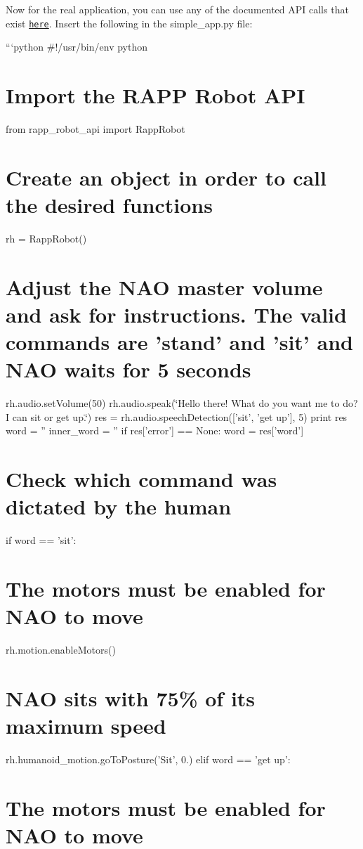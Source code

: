 Now for the real application, you can use any of the documented A\-P\-I calls that exist \href{https://github.com/rapp-project/rapp-robots-api/tree/master/python}{\tt here}. Insert the following in the {\ttfamily simple\-\_\-app.\-py} file\-:

```python \#!/usr/bin/env python

\section*{Import the R\-A\-P\-P Robot A\-P\-I}

from rapp\-\_\-robot\-\_\-api import Rapp\-Robot \section*{Create an object in order to call the desired functions}

rh = Rapp\-Robot()

\section*{Adjust the N\-A\-O master volume and ask for instructions. The valid commands are 'stand' and 'sit' and N\-A\-O waits for 5 seconds}

rh.\-audio.\-set\-Volume(50) rh.\-audio.\-speak(\char`\"{}\-Hello there! What do you want me to do? I can sit or get up.\char`\"{}) res = rh.\-audio.\-speech\-Detection(\mbox{[}'sit', 'get up'\mbox{]}, 5) print res word = '' inner\-\_\-word = '' if res\mbox{[}'error'\mbox{]} == None\-: word = res\mbox{[}'word'\mbox{]}

\section*{Check which command was dictated by the human}

if word == 'sit'\-: \section*{The motors must be enabled for N\-A\-O to move}

rh.\-motion.\-enable\-Motors() \section*{N\-A\-O sits with 75\% of its maximum speed}

rh.\-humanoid\-\_\-motion.\-go\-To\-Posture('Sit', 0.) elif word == 'get up'\-: \section*{The motors must be enabled for N\-A\-O to move}

